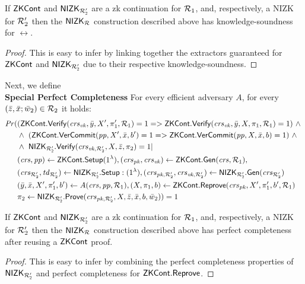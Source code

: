 \begin{lemma} 
\label{le:KS_for_nizkR}
If $\ZKCont$ and $\nizktwo$ are a zk continuation for $\relone$, and, respectively, a NIZK 
for $\reltwo'$ then the $\nizkR$ construction described above has knowledge-soundness for $\rel$. 
\end{lemma} 
\begin{proof}This is easy to infer by linking together the extractors guaranteed for $\ZKCont$ and $\nizktwo$ due to their respective 
knowledge-soundness.
\end{proof}
 
\noindent Next, we define \\ 
\noindent \textbf{Special Perfect Completeness} For every efficient adversary $A$, for every 
 $(\barz, \barx; \baromega_2) \in \reltwo$ it holds: 
\begin{align*}
\mathit{Pr} (& (\ZKCont.\Verify(\crsvk, \bar{y}, X', \pi'_1, \relone) = 1  = >  \ZKCont.\Verify(\crsvk, \bar{y}, X, \pi_1, \relone) = 1)  \ \wedge \  \\
                   & \wedge \ (\ZKCont.\VerifyCom (\pp, X', \barx, b') = 1 => \ZKCont.\VerifyCom (\pp, X, \barx, b) = 1) \ \wedge \\
                   & \wedge \ \nizktwo.\Verify(\crsvktwo, X, \barz, \pi_2) =1 | \\
                   & (\crs, \pp) \leftarrow \ZKCont.\Setup (1^{\lambda}), (\crspk, \crsvk) \leftarrow \ZKCont.\Gen(\crs, \relone), \\ 
                   & (\crstwo, \twtwo) \leftarrow \nizktwo.\Setup: (1^{\lambda}), (\crspktwo, \crsvktwo) \leftarrow \nizktwo.\Gen(\crstwo) \\
                   & (\bary, \barx, X', \pi'_1, b') \leftarrow A(\crs,\pp, \relone), (X, \pi_1, b) \leftarrow \ZKCont.\Reprove(\crspk, X', \pi'_1, b', \relone) \\
                   &\pi_2 \leftarrow \nizktwo.\Prove(\crspktwo, X, \barz, \barx, b, \baromega_2)) = 1
\end{align*}

\begin{lemma} 
\label{le:specialCompl_for_nizkR}
If $\ZKCont$ and $\nizktwo$ are a zk continuation for $\relone$, and, respectively, a NIZK 
for $\reltwo'$ then the $\nizkR$ construction described above has perfect completeness after reusing a $\ZKCont$ proof.
\end{lemma} 
\begin{proof} This is easy to infer by combining the perfect completeness properties of $\nizktwo$ and perfect completeness 
for $\ZKCont.\Reprove$.
\end{proof}

